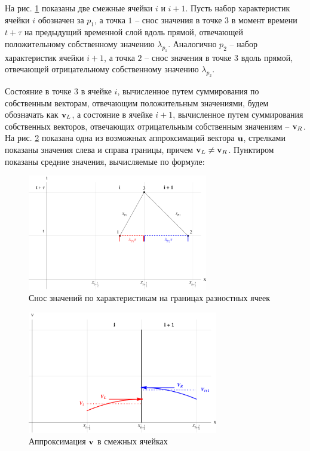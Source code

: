 \documentclass[12pt,a4paper]{article}
\newcommand{\picref}[1]{рис. \ref{#1}}
\begin{document}
    На \picref{fig:visualization} показаны две смежные ячейки $i$ и $i + 1$. Пусть набор характеристик ячейки $ i $ обозначен за $p_1$, а точка $1$ -- снос значения в точке $3$ в момент времени $ t + \tau $ на предыдущий временной слой вдоль прямой, отвечающей положительному собственному значению $ \lambda_{p_1} $. Аналогично $p_2$ -- набор характеристик ячейки $i + 1$, а точка $2$ -- снос значения в точке $3$ вдоль прямой, отвечающей отрицательному собственному значению $ \lambda_{p_2} $.

    Состояние в точке $3$ в ячейке $ i $, вычисленное путем суммирования по собственным векторам, отвечающим положительным значениями, будем обозначать как $\bold v_L$, а состояние в ячейке $ i + 1 $, вычисленное путем суммирования собственных векторов, отвечающих отрицательным собственным значениям -- $ \bold v_R $. На \picref{fig:approx} показана одна из возможных аппроксимаций вектора $ \bold u $, стрелками показаны значения слева и справа границы, причем $ \bold v_L \neq \bold v_R $. Пунктиром показаны средние значения, вычисляемые по формуле:

    \pagebreak

    \begin{figure}[h]
        \centering
        \includegraphics[width=0.7\textwidth]{visualization.pdf}
        \caption{Снос значений по характеристикам на границах разностных ячеек}
        \label{fig:visualization}
    \end{figure}

    \vskip 3cm

    \begin{figure}[h]
        \centering
        \includegraphics[width=0.74\textwidth]{approximation.pdf}
        \caption{Аппроксимация $\bold v$ в смежных ячейках}
        \label{fig:approx}
    \end{figure}
\end{document}
